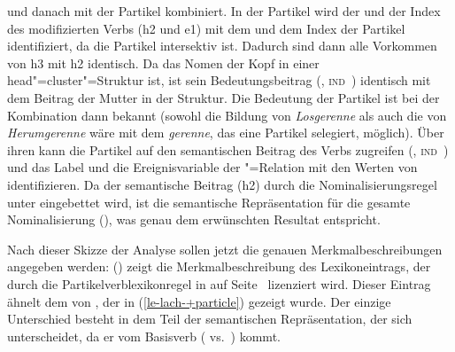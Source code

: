 und danach mit der Partikel kombiniert. In der Partikel wird der \ltopw und der Index des
modifizierten Verbs (h2 und e1) mit dem \ltopw und dem Index der Partikel identifiziert, da die
Partikel intersektiv ist. Dadurch sind dann alle Vorkommen von h3 mit h2 identisch. Da das Nomen 
der Kopf in einer head"=cluster"=Struktur ist, ist sein Bedeutungsbeitrag (\ltop {},
\textsc{ind} \,) 
identisch mit dem Beitrag der Mutter in der Struktur. Die Bedeutung der Partikel
ist bei der Kombination dann bekannt (sowohl die Bildung von \emph{Losgerenne}
als auch die von \emph{Herumgerenne} wäre mit dem \emph{gerenne}, das eine Partikel
selegiert, möglich). Über ihren \modw kann die Partikel auf den semantischen
Beitrag des Verbs zugreifen (\ltop {}, \textsc{ind} \,)  und das Label
und die Ereignisvariable der "=Relation mit den Werten von  identifizieren.
Da der semantische Beitrag (\ltop h2) durch die Nominalisierungsregel unter 
eingebettet wird, ist die semantische Repräsentation für die gesamte Nominalisierung (), was genau dem erwünschten Resultat entspricht.
\ea
{}
\z

\noindent
Nach dieser Skizze der Analyse sollen jetzt die genauen Merkmalbeschreibungen angegeben werden:
() zeigt die Merkmalbeschreibung des Lexikoneintrags, der durch die Partikelverblexikonregel
in  auf Seite~\pageref{lr-pv} lizenziert wird. Dieser Eintrag ähnelt dem von , 
der in (\ref{le-lach-+particle}) gezeigt wurde. Der einzige Unterschied besteht
in dem Teil der semantischen Repräsentation, der sich unterscheidet,
da er vom Basisverb ( vs.\ ) kommt.

